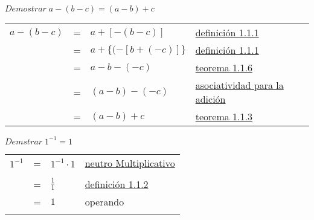 
\begin{teo}
\label{Teo 1.8}
$Demostrar \; a-(b-c)=(a-b)+c$ \label{teo 1.1.8}
\begin{center}
\begin{tabular}{r c l l}
$a-(b-c)$&=&$a+\left[-(b-c)\right]$&\hyperref[def 1.1.1]{definición 1.1.1}\\
&=&$a+\lbrace(-\left[b+(-c)\right]\rbrace$&\hyperref[def 1.1.1]{definición 1.1.1}\\
&=&$a- b-(-c) $&\hyperref[teo 1.1.6]{teorema 1.1.6}\\
&=&$(a-b)-(-c)$&\hyperref[A3]{asociatividad para la adición}\\
&=&$(a-b)+c$&\hyperref[teo 1.1.3]{teorema 1.1.3}\\
\end{tabular}
\end{center}
\end{teo}

\begin{teo}
$Demstrar \; 1^{-1}=1$ \label{1.1.9}
\begin{center}
\begin{tabular}{r c l l}
$1^{-1}$&=&$ 1^{-1} \cdot 1$&\hyperref[A4]{neutro Multiplicativo}\\\\
&=&$\displaystyle \frac{1}{1}$&\hyperref[def 1.1.2]{definición 1.1.2}\\
&=&$1$&operando\\\\
\end{tabular}
\end{center}
\end{teo}

